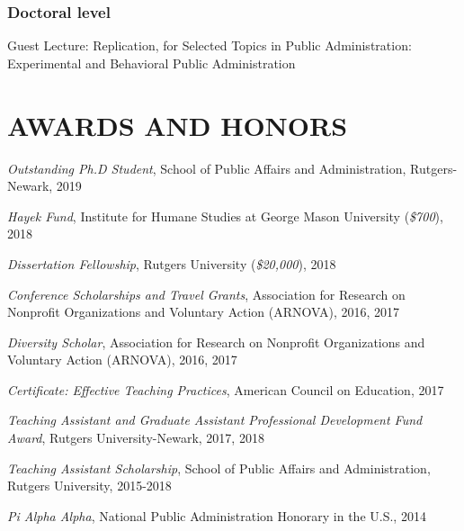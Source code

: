\documentclass[letterpaper]{article}
\renewenvironment{itemize}{
  \begin{list}{}{
    \setlength{\leftmargin}{1.5em}
  }
}{
  \end{list}
}
\begin{document}
\subsubsection*{Doctoral level}
\begin{itemize}	
\item Guest Lecture: Replication, for Selected Topics in Public Administration: Experimental and Behavioral Public Administration
\end{itemize}

\bigskip


\section*{AWARDS AND HONORS}
\begin{itemize}
	
\item {\it Outstanding Ph.D Student}, School of Public Affairs and Administration, Rutgers-Newark, 2019

\item {\it Hayek Fund}, Institute for Humane Studies at George Mason University ({\it \$700}), 2018

\item {\it Dissertation Fellowship}, Rutgers University ({\it \$20,000}), 2018

\item {\it Conference Scholarships and Travel Grants}, Association for Research on Nonprofit Organizations and Voluntary Action (ARNOVA), 2016, 2017

\item {\it Diversity Scholar}, Association for Research on Nonprofit Organizations and Voluntary Action (ARNOVA), 2016, 2017

\item {\it Certificate: Effective Teaching Practices}, American Council on Education, 2017

\item {\it Teaching Assistant and Graduate Assistant Professional Development Fund Award}, Rutgers University-Newark, 2017, 2018

\item {\it Teaching Assistant Scholarship}, School of Public Affairs and Administration, Rutgers University, 2015-2018

\item {\it Pi Alpha Alpha}, National Public Administration Honorary in the U.S., 2014

\end{itemize}
\end{document}
